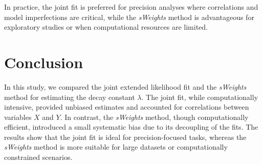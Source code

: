 \documentclass[11pt, a4paper]{article}
\begin{document}
In practice, the joint fit is preferred for precision analyses where correlations and model imperfections are critical, while the \textit{sWeights} method is advantageous for exploratory studies or when computational resources are limited.
\section{Conclusion}

In this study, we compared the joint extended likelihood fit and the \textit{sWeights} method for estimating the decay constant \(\lambda\). The joint fit, while computationally intensive, provided unbiased estimates and accounted for correlations between variables \(X\) and \(Y\). In contrast, the \textit{sWeights} method, though computationally efficient, introduced a small systematic bias due to its decoupling of the fits. The results show that the joint fit is ideal for precision-focused tasks, whereas the \textit{sWeights} method is more suitable for large datasets or computationally constrained scenarios.


\newpage

\end{document}
